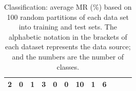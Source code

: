 \begin{table}[h!]
{\begin{minipage}{\textwidth}
{\begin{tabular}{@{\extracolsep{\fill}}lrrrrrrrrrrr@{\extracolsep{\fill}}}
					2     & 0     & 1     & 3     & 0     & 0     & 10    & 1     & 6 \\
					\bottomrule
			\end{tabular}}
		\end{minipage}
	\caption{Classification: average MR (\%) based on 100 random partitions of each data set into training and test sets. The alphabetic notation in the brackets of each dataset represents the data source; and the numbers are the number of classes.}\label{Table2}%
}
\end{table}


